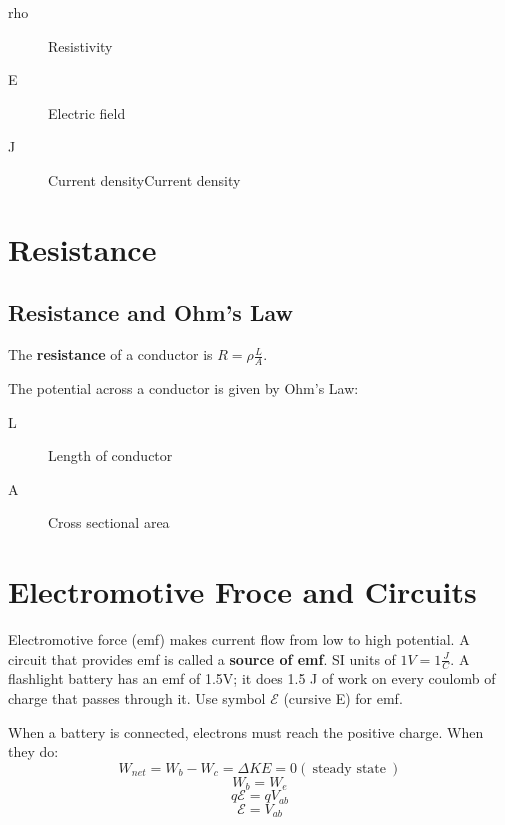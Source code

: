 
\begin{description}
	\item[rho] Resistivity
	\item[E] Electric field
		\item[J] Current densityCurrent density
\end{description}


\section{Resistance}%
\label{sec:resistance}

\subsection{Resistance and Ohm's Law}%
\label{sub:resistance_and_ohm_s_law}

The \textbf{resistance} of a conductor is $R = \rho \frac{L}{A}$.

The potential across a conductor is given by Ohm's Law:


\begin{description}
	\item[L] Length of conductor
		\item[A] Cross sectional  area
\end{description}

\section{Electromotive Froce and Circuits}%
\label{sec:electromotive_froce_and_circuits}

Electromotive force (emf) makes current flow from low to high potential. A circuit that
provides emf is called a \textbf{source of emf}. SI units of $1 V = 1 \frac{J}{C}$.
A flashlight battery has an emf of 1.5V; it does 1.5 J of work on every coulomb of charge that
passes through it.
Use symbol $\mathcal{E}$ (cursive E) for emf.


When a battery is connected, electrons must reach the positive charge. When they do:
\[W_{net} = W_{b} - W_{c} = \Delta KE = 0 (\:\text{steady state}\:)\]
\[W_{b} = W_{e}\]
\[q \mathcal{E} = q V_{ab}\]
\[\mathcal{E} = V_{ab}\]

